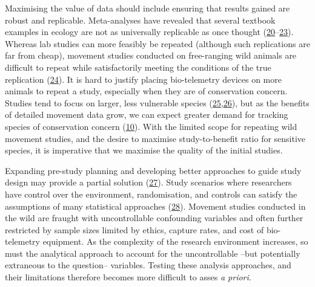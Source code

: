 \documentclass[10pt,a4paper]{article}
\begin{document}
Maximising the value of data should include ensuring that results gained are robust and replicable.
Meta-analyses have revealed that several textbook examples in ecology are not as universally replicable as once thought (\protect\hyperlink{ref-clark_ocean_2020}{20}--\protect\hyperlink{ref-wang_irreproducible_2018}{23}).
Whereas lab studies can more feasibly be repeated (although such replications are far from cheap), movement studies conducted on free-ranging wild animals are difficult to repeat while satisfactorily meeting the conditions of the true replication (\protect\hyperlink{ref-fraser_role_2020}{24}).
It is hard to justify placing bio-telemetry devices on more animals to repeat a study, especially when they are of conservation concern.
Studies tend to focus on larger, less vulnerable species (\protect\hyperlink{ref-crane_lots_2021}{25},\protect\hyperlink{ref-tam_quantifying_2021}{26}), but as the benefits of detailed movement data grow, we can expect greater demand for tracking species of conservation concern (\protect\hyperlink{ref-Fraser2018}{10}).
With the limited scope for repeating wild movement studies, and the desire to maximise study-to-benefit ratio for sensitive species, it is imperative that we maximise the quality of the initial studies.

Expanding pre-study planning and developing better approaches to guide study design may provide a partial solution (\protect\hyperlink{ref-williams_optimizing_2020}{27}).
Study scenarios where researchers have control over the environment, randomisation, and controls can satisfy the assumptions of many statistical approaches (\protect\hyperlink{ref-christie_simple_2019}{28}).
Movement studies conducted in the wild are fraught with uncontrollable confounding variables and often further restricted by sample sizes limited by ethics, capture rates, and cost of bio-telemetry equipment.
As the complexity of the research environment increases, so must the analytical approach to account for the uncontrollable --but potentially extraneous to the question-- variables.
Testing these analysis approaches, and their limitations therefore becomes more difficult to asses \emph{a priori}.
\end{document}
